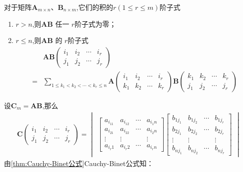 \begin{green}
\begin{corollary}\label{cor:Cauchy-Binet公式推广到子式}
    对于矩阵$\bm{A}_{m \times n}$、$
    \bm{B}_{n \times m}$,它们的积的$r\left(
        1 \leqslant  
    r \leqslant m\right)$阶子式
    \begin{enumerate}[label=\textup{(\arabic*)}]
        \item $r > n$,则$\bm{AB}$
            任一
        $r$阶子式为零；
        \item $ r \leqslant n$,则$\bm{AB}$
            的
        $r$阶子式
        \begin{align*}
        &\bm{AB}\begin{pmatrix}
            i_1 &i_2& \cdots & i_r \\
            j_1 &j_2& \cdots & j_r
        \end{pmatrix}\\
        =&
        \sum_{1 \leqslant  k_1 <k_2
        < \cdots < k_r \leqslant 
        n}\bm{A}
        \begin{pmatrix}
            i_1 & i_2&\cdots & i_r \\
            k_1 & k_2&\cdots & k_r
        \end{pmatrix}
        \bm{B}\begin{pmatrix}
            k_1 & k_2&\cdots & k_r \\
            j_1 & j_2&\cdots & j_r
        \end{pmatrix}
    \end{align*}
    \end{enumerate}
\end{corollary}
\begin{Proof}
设$\bm{C}_{m}=\bm{AB}$,那么
\begin{align*}
    \bm{C}\begin{pmatrix}
        i_1&i_2&\cdots&i_r\\
        j_1&j_2&\cdots&j_r
    \end{pmatrix}=\begin{vmatrix}
        \begin{bmatrix}
            a_{i_11}&a_{i_12}&\cdots&a_{i_1n}\\
            a_{i_21}&a_{i_22}&\cdots&a_{i_2n}\\
            \vdots&\vdots&&\vdots\\
            a_{i_r1}&a_{i_r2}&\cdots&a_{i_rn}
        \end{bmatrix}
        \begin{bmatrix}
            b_{1j_1}&b_{1j_2}&\cdots&b_{1j_r}\\
            b_{2j_1}&b_{2j_2}&\cdots&b_{2j_r}\\
            \vdots&\vdots&&\vdots\\
            b_{nj_1}&b_{nj_2}&\cdots&b_{nj_r}
        \end{bmatrix}
    \end{vmatrix}
\end{align*}
由\cref{thm:Cauchy-Binet公式}Cauchy-Binet公式知：


\end{Proof}
\end{green}
